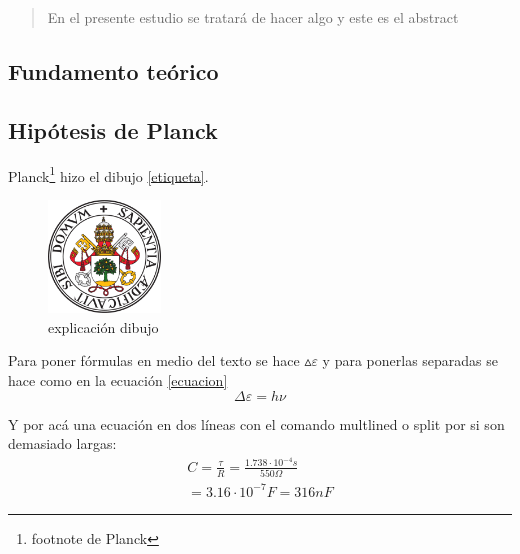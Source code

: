 \documentclass[12pt,a4paper]{article}
\begin{document}
\renewcommand{\abstractname}{Abstract} %
\begin{abstract}
En el presente estudio se tratará de hacer algo y este es el abstract
\end{abstract}
\begin{multicols}{2} %

\section{Fundamento teórico}
\subsection{Hipótesis de Planck}
Planck\footnote{footnote de Planck} hizo el dibujo \eqref{etiqueta}.

\begin{figure}[H]
\centering
\includegraphics[width=3cm]{fotos/escudo}
\caption{explicación dibujo \cite{referencia}}
\label{etiqueta}
\end{figure}

Para poner fórmulas en medio del texto se hace ${\vartriangle}\varepsilon$ y para ponerlas separadas se hace como en la ecuación \eqref{ecuacion}
\begin{equation}
\Delta\varepsilon=h\nu
\label{ecuacion}
\end{equation} %

Y por acá una ecuación en dos líneas con el comando multlined o split por si son demasiado largas:
\begin{equation*}
\begin{multlined}
C=\frac{\tau}{R}=\frac{1.738\cdot10^{-4}s}{550\Omega}\\
=3.16\cdot10^{-7}F=316nF
\end{multlined}
\end{equation*}


\end{multicols}
\end{document}

